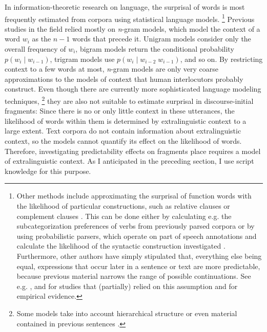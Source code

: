 In information-theoretic research on language, the surprisal of words is most frequently estimated from corpora using statistical language models.%
%
\footnote{Other methods include approximating the surprisal of function words with the likelihood of particular constructions, such as relative clauses \citep{levy.jaeger2007} or complement clauses \citep{jaeger2010}. This can be done either by calculating e.g. the subcategorization preferences of verbs from previously parsed corpora \citep{jaeger2010} or by using probabilistic parsers, which operate on part of speech annotations and calculate the likelihood of the syntactic construction investigated \citep{levy.jaeger2007}. Furthermore, other authors have simply stipulated that, everything else being equal, expressions that occur later in a sentence or text are more predictable, because previous material narrows the range of possible continuations. See e.g. \citet{fenk-oczlon1989}, \citet{fenk-oczlon1990} and \citet{genzel.charniak2002} for studies that (partially) relied on this assumption and \citet[1147]{levy2008} for empirical evidence.
}\afterfn%
%
Previous studies in the field relied mostly on \textit{n}-gram models, which model the context of a word $w_{i}$ as the $n-1$ words that precede it. Unigram models consider only the overall frequency of $w_{i}$, bigram models return the conditional probability $p(w_i \mathbin{|} w_{i-1})$, trigram models use  $p(w_i \mathbin{|} w_{i-2}\; w_{i-1})$, and so on. By restricting context to a few words at most, \textit{n}-gram models are only very coarse approximations to the models of context that human interlocutors probably construct. Even though there are currently more sophisticated language modeling techniques,%
%
\footnote{Some models take into account hierarchical structure \citep{stolcke1995, hale2001,roark2001, levy2008} or even material contained in previous sentences \citep{iyer.ostendorf1996, oualil.etal2016, oualil.etal2017, singh.etal2016a, grave.etal2017, khandelwal.etal2018, devlin.etal2019}.}\afterfn%
%
they are also not suitable to estimate surprisal in discourse-initial fragments: Since there is no or only little context in these utterances, the likelihood of words within them is determined by extralinguistic context to a large extent. Text corpora do not contain information about extralinguistic context, so the models cannot quantify its effect on the likelihood of words. Therefore, investigating predictability effects on fragments place requires a model of extralinguistic context. As I anticipated in the preceding section, I use script knowledge for this purpose.

